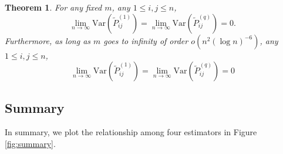 \documentclass[a4paper]{article}
\newtheorem{theorem}[fact]{Theorem}
\begin{document}
\begin{theorem}
\label{thm:varianceL1andLq}
For any fixed $m$, any $1 \le i,j \le n$,
\[
	\lim_{n \to \infty} \mathrm{Var}(\widetilde{P}_{ij}^{(1)})
    = \lim_{n \to \infty} \mathrm{Var}(\widetilde{P}_{ij}^{(q)}) = 0.
\]
Furthermore, as long as $m$ goes to infinity of order $o(n^2 (\log n)^{-6})$, any $1 \le i,j \le n$,
\[
	\lim_{n \to \infty} \mathrm{Var}(\widetilde{P}_{ij}^{(1)})
    = \lim_{n \to \infty} \mathrm{Var}(\widetilde{P}_{ij}^{(q)}) = 0
\]
\end{theorem}






\subsection{Summary}
In summary, we plot the relationship among four estimators in Figure \ref{fig:summary}.
\end{document}
